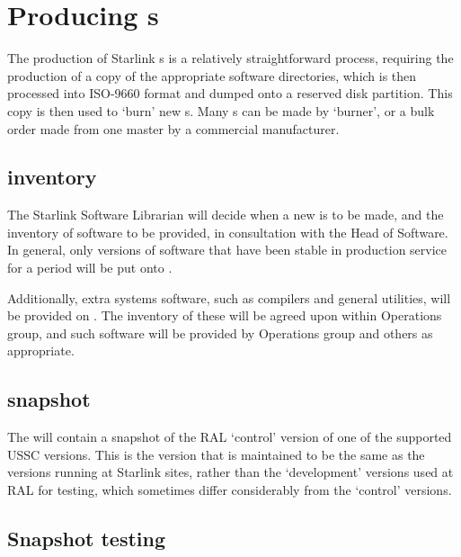 \documentclass[twoside,11pt]{article}
\newcommand{\xlabel}[1]{}
\begin{document}
\newpage
\section{\label{producing_cdroms}\xlabel{producing_cdroms}Producing {}s}

The production of Starlink {}s is a relatively straightforward
process, requiring the production of a copy of the appropriate
software directories, which is then processed into ISO-9660 format and
dumped onto a reserved disk partition.  This copy is then used to
`burn' new {}s.  Many {}s can be made by
{} `burner', or a bulk order made from one master by a
commercial manufacturer.

\subsection{\label{cdrom_inventory}\xlabel{cdrom_inventory}{} inventory}

The Starlink Software Librarian will decide when a new {} is
to be made, and the inventory of software to be provided, in
consultation with the Head of Software.  In general, only versions of
software that have been stable in production service for a period will
be put onto {}.

Additionally, extra systems software, such as compilers and general
utilities, will be provided on {}.  The inventory of these will be
agreed upon within Operations group, and such software will  be
provided by Operations group and others as appropriate.

\subsection{\label{cdrom_snapshot}\xlabel{cdrom_snapshot}{} snapshot}

The {} will contain a snapshot of the RAL `control' version
of one of the supported USSC versions.  This is the version that is
maintained to be the same as the versions running at Starlink sites,
rather than the `development' versions used at RAL for testing,
which sometimes differ considerably from the `control' versions.

\subsection{\label{snapshot_testing}\xlabel{snapshot_testing}Snapshot testing}
\end{document}
